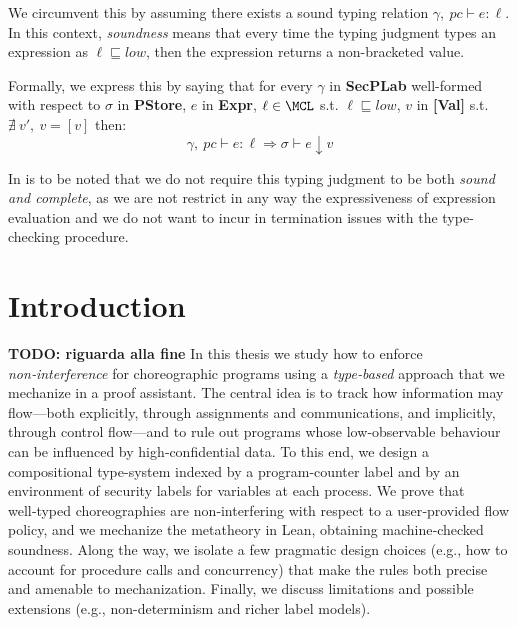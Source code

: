 We circumvent this by assuming there exists a sound typing relation $ \gamma,~pc \vdash e: \ell $.
In this context, \emph{soundness} means that every time the typing judgment types an expression as $\ell \sqsubseteq low$, then the expression returns a non-bracketed value.

Formally, we express this by saying that for every $\gamma$ in \textbf{SecPLab} well-formed with respect to $\sigma$ in \textbf{PStore}, $e$ in \textbf{Expr}, $\ell \in \MCL$ s.t. $\ell \sqsubseteq low$, $v$ in \textbf{[Val]} s.t. $\nexists~v',~v = [v]$ then:
$$
\gamma,~pc \vdash e: \ell \Rightarrow \sigma \vdash e \downarrow v
$$

In is to be noted that we do not require this typing judgment to be both \emph{sound and complete}, as we are not restrict in any way the expressiveness of expression evaluation and we do not want to incur in termination issues with the type-checking procedure.




\chapter{Introduction} \label{chap:intro}
\pagestyle{plain}
\setcounter{page}{1}
\textbf{TODO: riguarda alla fine}
In this thesis we study how to enforce \emph{non‑interference} for choreographic programs using a \emph{type‑based} approach that we mechanize in a proof assistant.
The central idea is to track how information may flow—both explicitly, through assignments and communications, and implicitly, through control flow—and to rule out programs whose low‑observable behaviour can be influenced by high‑confidential data.
To this end, we design a compositional type-system indexed by a program‑counter label and by an environment of security labels for variables at each process.
We prove that well‑typed choreographies are non‑interfering with respect to a user‑provided flow policy, and we mechanize the metatheory in Lean, obtaining machine‑checked soundness.
Along the way, we isolate a few pragmatic design choices (e.g., how to account for procedure calls and concurrency) that make the rules both precise and amenable to mechanization.
Finally, we discuss limitations and possible extensions (e.g., non-determinism and richer label models).



